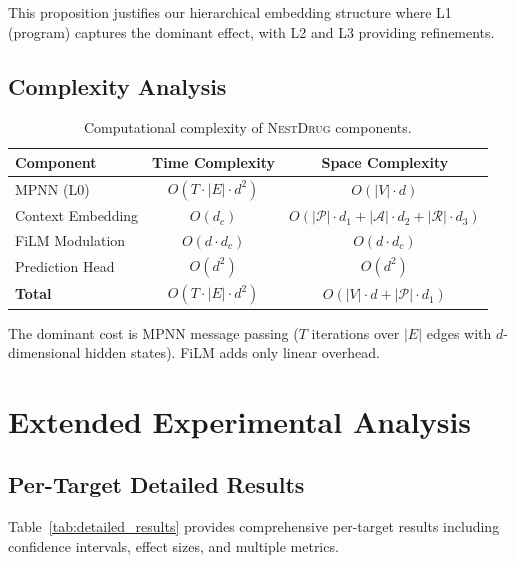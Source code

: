 \documentclass[sigconf,anonymous]{acmart}
\newcommand{\methodname}{\textsc{NestDrug}}
\begin{document}
This proposition justifies our hierarchical embedding structure where L1 (program) captures the dominant effect, with L2 and L3 providing refinements.

\subsection{Complexity Analysis}

\begin{table}[h]
\caption{Computational complexity of \methodname{} components.}
\label{tab:complexity}
\centering
\small
\begin{tabular}{@{}lcc@{}}
\toprule
Component & Time Complexity & Space Complexity \\
\midrule
MPNN (L0) & $O(T \cdot |E| \cdot d^2)$ & $O(|V| \cdot d)$ \\
Context Embedding & $O(d_c)$ & $O(|\mathcal{P}| \cdot d_1 + |\mathcal{A}| \cdot d_2 + |\mathcal{R}| \cdot d_3)$ \\
FiLM Modulation & $O(d \cdot d_c)$ & $O(d \cdot d_c)$ \\
Prediction Head & $O(d^2)$ & $O(d^2)$ \\
\midrule
\textbf{Total} & $O(T \cdot |E| \cdot d^2)$ & $O(|V| \cdot d + |\mathcal{P}| \cdot d_1)$ \\
\bottomrule
\end{tabular}
\end{table}

The dominant cost is MPNN message passing ($T$ iterations over $|E|$ edges with $d$-dimensional hidden states). FiLM adds only linear overhead.

\section{Extended Experimental Analysis}
\label{app:extended}

\subsection{Per-Target Detailed Results}

Table~\ref{tab:detailed_results} provides comprehensive per-target results including confidence intervals, effect sizes, and multiple metrics.
\end{document}
